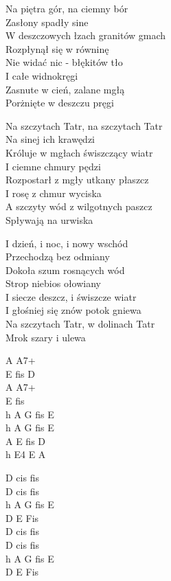 \begin{text}
    Na piętra gór, na ciemny bór\\
    Zasłony spadły sine\\
    W deszczowych łzach granitów gmach\\
    Rozpłynął się w równinę\\
    Nie widać nic - błękitów tło\\
    I całe widnokręgi\\
    Zasnute w cień, zalane mgłą\\
    Porżnięte w deszczu pręgi

    Na szczytach Tatr, na szczytach Tatr\\
    Na sinej ich krawędzi\\
    Króluje w mgłach świszczący wiatr\\
    I ciemne chmury pędzi\\
    Rozpostarł z mgły utkany płaszcz\\
    I rosę z chmur wyciska\\
    A szczyty wód z wilgotnych paszcz\\
    Spływają na urwiska

    I dzień, i noc, i nowy wschód\\
    Przechodzą bez odmiany\\
    Dokoła szum rosnących wód\\
    Strop niebios ołowiany\\
    I siecze deszcz, i świszcze wiatr\\
    I głośniej się znów potok gniewa\\
    Na szczytach Tatr, w dolinach Tatr\\
    Mrok szary i ulewa
\end{text}
\begin{chord}
    A A7+\\
    E fis D\\
    A A7+\\
    E fis\\
    h A G fis E\\
    h A G fis E\\
    A E fis D\\
    h E4 E A

    D cis fis\\
    D cis fis\\
    h A G fis E\\
    D E Fis\\
    D cis fis\\
    D cis fis\\
    h A G fis E\\
    D E Fis
\end{chord}